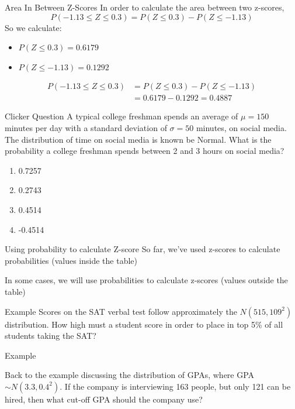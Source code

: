 \documentclass{beamer}
\begin{document}
\begin{frame}{Area In Between Z-Scores}
	In order to calculate the area between two z-scores, 
	\[ 
		P(-1.13 \leq Z \leq 0.3) = P(Z \leq 0.3) - P(Z \leq -1.13)
	\]
	So we calculate:
	\begin{itemize}
		\item $P(Z \leq 0.3) = 0.6179$
		\item $P(Z \leq -1.13) = 0.1292$
	\end{itemize}
	
	\begin{align*}
		P(-1.13 \leq Z \leq 0.3) &= P(Z \leq 0.3) - P(Z \leq -1.13) \\ 
		&= 0.6179-0.1292 = 0.4887
	\end{align*}
\end{frame}

\begin{frame}{Clicker Question}
	A typical college freshman spends an average of $\mu=150$ minutes per day with a standard deviation of $\sigma=50$ minutes, on social media. The distribution of time on social media is known be Normal. What is the probability a college freshman spends between 2 and 3 hours on social media?
	
	\begin{enumerate}[label=(\alph*)]
		\item 0.7257
		\item 0.2743
		\item 0.4514
		\item -0.4514
	\end{enumerate}
\end{frame} 



\begin{frame}{Using probability to calculate Z-score}
	So far, we've used z-scores to calculate probabilities (values inside the table)
	
	In some cases, we will use probabilities to calculate z-scores (values outside the table)
\end{frame}

\begin{frame}[t]{Example}
	Scores on the SAT verbal test follow approximately the $N(515,109^2)$ distribution. How high must a student score in order to place in top 5\% of all students taking the SAT?
\end{frame}


\begin{frame}[t]{Example}
	
	Back to the example discussing the distribution of GPAs, where GPA  $\sim N(3.3, 0.4^2)$. If the company is interviewing 163 people, but only 121 can be hired, then what cut-off GPA should the company use?
	
\end{frame}
\end{document}

